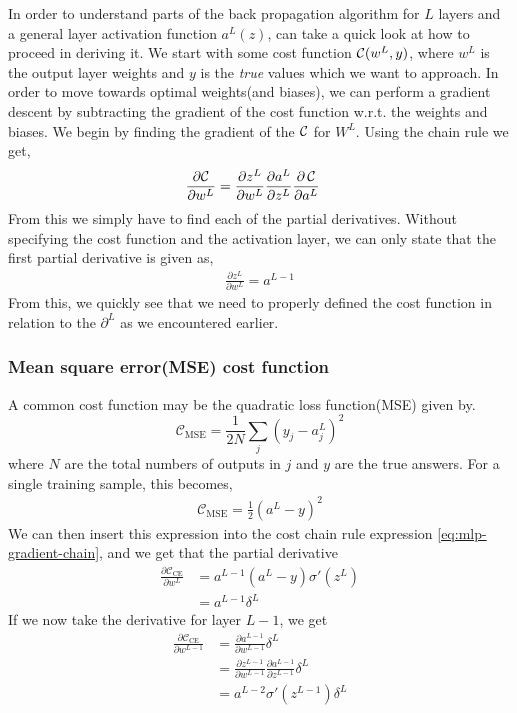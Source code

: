 In order to understand parts of the back propagation algorithm for $L$ layers and a general layer activation function $a^L(z)$, can take a quick look at how to proceed in deriving it. We start with some cost function $\operatorname*{\mathcal{C}}(w^L, y)$, where $w^L$ is the output layer weights and $y$ is the \textit{true} values which we want to approach. In order to move towards optimal weights(and biases), we can perform a gradient descent by subtracting the gradient of the cost function w.r.t. the weights and biases. We begin by finding the gradient of the $\operatorname*{\mathcal{C}}$ for $W^L$. Using the chain rule we get,
\begin{align}
    \frac{\partial \mathcal{C}}{\partial w^L} &= \frac{\partial z^L}{\partial w^L} \frac{\partial a^L}{\partial z^L} \frac{\partial \operatorname*{\mathcal{C}}}{\partial a^L}
    \label{eq:mlp-gradient-chain}
\end{align}
From this we simply have to find each of the partial derivatives. Without specifying the cost function and the activation layer, we can only state that the first partial derivative is given as,
\begin{align*}
\frac{\partial z^L}{\partial w^L} = a^{L-1}
\end{align*}
From this, we quickly see that we need to properly defined the cost function in relation to the $\partial^L$ as we encountered earlier.

\subsubsection{Mean square error(MSE) cost function}
A common cost function may be the quadratic loss function(MSE) given by.
\begin{equation}
    \mathcal{C}_\mathrm{MSE} = \frac{1}{2N} \sum\limits_{j} (y_j - a_j^L)^2
\end{equation}
where $N$ are the total numbers of outputs in $j$ and $y$ are the true answers. For a single training sample, this becomes,
\begin{align}
    \mathcal{C}_\mathrm{MSE} = \frac{1}{2} (a^L - y)^2
    \label{eq:mse-mlp-cost}
\end{align}
We can then insert this expression into the cost chain rule expression \eqref{eq:mlp-gradient-chain}, and we get that the partial derivative
\begin{align*}
    \frac{\partial \mathcal{C}_\mathrm{CE}}{\partial w^L} &= a^{L-1}(a^L - y)\sigma'(z^L) \\
    &= a^{L-1} \delta^L
\end{align*}
If we now take the derivative for layer $L-1$, we get
\begin{align*}
    \frac{\partial \mathcal{C}_\mathrm{CE}}{\partial w^{L-1}} &= \frac{\partial a^{L-1}}{\partial w^{L-1}} \delta^L \\
    &= \frac{\partial z^{L-1}}{\partial w^{L-1}} \frac{\partial a^{L-1}}{\partial z^{L-1}} \delta^L \\
    &= a^{L-2}\sigma'(z^{L-1})\delta^L
\end{align*}

